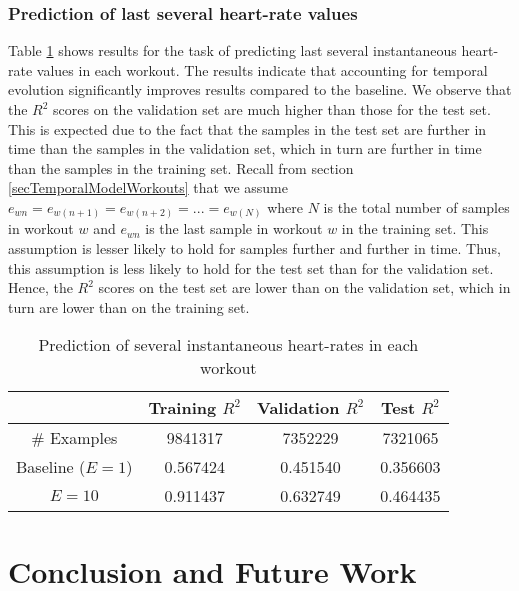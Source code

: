 \documentclass{acm_proc_article-sp}
\begin{document}
\subsubsection{Prediction of last several heart-rate values}

Table \ref{tableInstManyHr} shows results for the task of predicting last several instantaneous heart-rate values in each workout. The results indicate that accounting for temporal evolution significantly improves results compared to the baseline. We observe that the $R^2$ scores on the validation set are much higher than those for the test set. This is expected due to the fact that the samples in the test set are further in time than the samples in the validation set, which in turn are further in time than the samples in the training set. Recall from section \ref{secTemporalModelWorkouts} that we assume $e_{wn} = e_{w(n+1)} = e_{w(n+2)} = ... = e_{w(N)}$ where $N$ is the total number of samples in workout $w$ and $e_{wn}$ is the last sample in workout $w$ in the training set. This assumption is lesser likely to hold for samples further and further in time. Thus, this assumption is less likely to hold for the test set than for the validation set. Hence, the $R^2$ scores on the test set
are lower than on the validation set, which in turn are lower than on the training set.
\begin{table}[h]
\centering
\begin{tabular}{|c|c|c|c|} \hline
& Training $R^2$ & Validation $R^2$ & Test $R^2$ \\ \hline
\# Examples &  9841317 & 7352229 & 7321065 \\ \hline
Baseline ($E = 1$) & 0.567424 & 0.451540 & 0.356603 \\ \hline
$E = 10$ & 0.911437 & 0.632749 & 0.464435 \\ \hline
\end{tabular}
\caption{Prediction of several instantaneous heart-rates in each workout}
\label{tableInstManyHr}
\end{table}

\section{Conclusion and Future Work}



\end{document}
